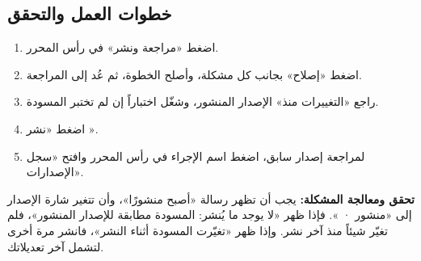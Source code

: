 \subsection{خطوات العمل والتحقق}
\begin{enumerate}
\item اضغط «مراجعة ونشر» في رأس المحرر.
\item اضغط «إصلاح» بجانب كل مشكلة، وأصلح الخطوة، ثم عُد إلى المراجعة.
\item راجع «التغييرات منذ» الإصدار المنشور، وشغّل اختباراً إن لم تختبر المسودة.
\item اضغط «نشر ».
\item لمراجعة إصدار سابق، اضغط اسم الإجراء في رأس المحرر وافتح «سجل الإصدارات».
\end{enumerate}

\textbf{تحقق ومعالجة المشكلة:} يجب أن تظهر رسالة «أصبح  منشورًا»، وأن تتغير شارة الإصدار إلى «منشور · ». فإذا ظهر «لا يوجد ما يُنشر: المسودة مطابقة للإصدار المنشور»، فلم تغيّر شيئاً منذ آخر نشر. وإذا ظهر «تغيّرت المسودة أثناء النشر»، فانشر مرة أخرى لتشمل آخر تعديلاتك.
